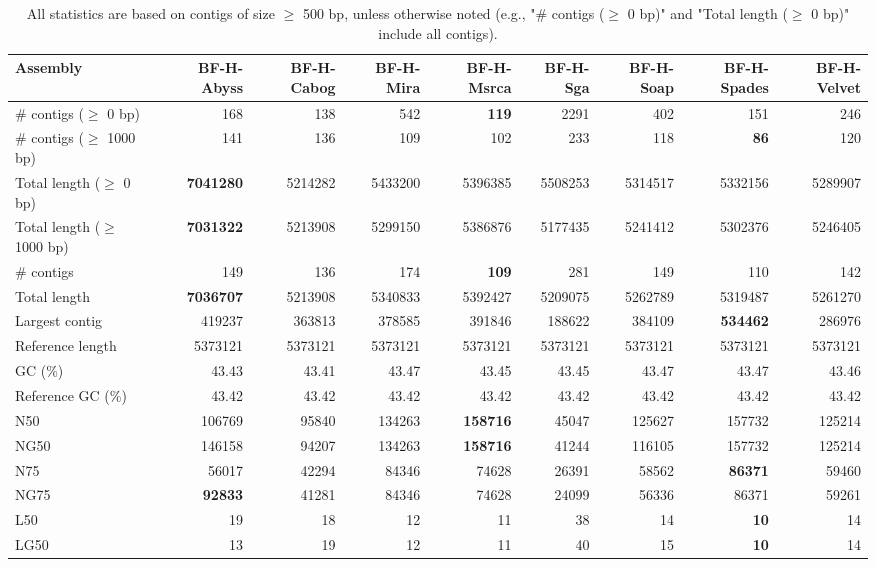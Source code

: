 \documentclass[12pt,a4paper]{article}
\begin{document}
\begin{table}[ht]
\begin{center}
\caption{All statistics are based on contigs of size $\geq$ 500 bp, unless otherwise noted (e.g., "\# contigs ($\geq$ 0 bp)" and "Total length ($\geq$ 0 bp)" include all contigs).}
\begin{tabular}{|l*{8}{|r}|}
\hline
Assembly & BF-H-Abyss & BF-H-Cabog & BF-H-Mira & BF-H-Msrca & BF-H-Sga & BF-H-Soap & BF-H-Spades & BF-H-Velvet \\ \hline
\# contigs ($\geq$ 0 bp) & 168 & 138 & 542 & {\bf 119} & 2291 & 402 & 151 & 246 \\ \hline
\# contigs ($\geq$ 1000 bp) & 141 & 136 & 109 & 102 & 233 & 118 & {\bf 86} & 120 \\ \hline
Total length ($\geq$ 0 bp) & {\bf 7041280} & 5214282 & 5433200 & 5396385 & 5508253 & 5314517 & 5332156 & 5289907 \\ \hline
Total length ($\geq$ 1000 bp) & {\bf 7031322} & 5213908 & 5299150 & 5386876 & 5177435 & 5241412 & 5302376 & 5246405 \\ \hline
\# contigs & 149 & 136 & 174 & {\bf 109} & 281 & 149 & 110 & 142 \\ \hline
Total length & {\bf 7036707} & 5213908 & 5340833 & 5392427 & 5209075 & 5262789 & 5319487 & 5261270 \\ \hline
Largest contig & 419237 & 363813 & 378585 & 391846 & 188622 & 384109 & {\bf 534462} & 286976 \\ \hline
Reference length & 5373121 & 5373121 & 5373121 & 5373121 & 5373121 & 5373121 & 5373121 & 5373121 \\ \hline
GC (\%) & 43.43 & 43.41 & 43.47 & 43.45 & 43.45 & 43.47 & 43.47 & 43.46 \\ \hline
Reference GC (\%) & 43.42 & 43.42 & 43.42 & 43.42 & 43.42 & 43.42 & 43.42 & 43.42 \\ \hline
N50 & 106769 & 95840 & 134263 & {\bf 158716} & 45047 & 125627 & 157732 & 125214 \\ \hline
NG50 & 146158 & 94207 & 134263 & {\bf 158716} & 41244 & 116105 & 157732 & 125214 \\ \hline
N75 & 56017 & 42294 & 84346 & 74628 & 26391 & 58562 & {\bf 86371} & 59460 \\ \hline
NG75 & {\bf 92833} & 41281 & 84346 & 74628 & 24099 & 56336 & 86371 & 59261 \\ \hline
L50 & 19 & 18 & 12 & 11 & 38 & 14 & {\bf 10} & 14 \\ \hline
LG50 & 13 & 19 & 12 & 11 & 40 & 15 & {\bf 10} & 14 \\ \hline

\end{tabular}
\end{center}
\end{table}
\end{document}
